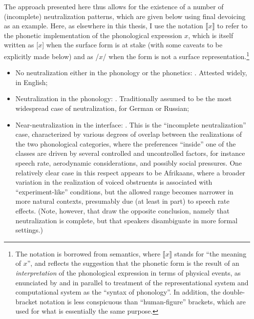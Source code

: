 The approach presented here thus allows for the existence of a number of (incomplete) neutralization patterns, which are given below using final devoicing as an example. Here, as elsewhere in this thesis, I use the notation $\llbracket x\rrbracket$ to refer to the phonetic implementation of the phonological expression $x$, which is itself written as [$x$] when the surface form is at stake (with some caveats to be explicitly made below) and as /$x$/ when the form is not a surface representation.\footnote{The notation is borrowed from semantics, where $\llbracket x\rrbracket$ stands for \enquote{the meaning of $x$}, and reflects the suggestion that the phonetic form is the result of an \emph{interpretation} of the phonological expression in terms of physical events, as enunciated by \citet{pierrehumbert90:_phonol} and in parallel to  treatment of the representational system and computational system as the \enquote{syntax of phonology}. In addition, the double\hyp bracket notation is less conspicuous than  \enquote{human\hyp figure} brackets, which are used for what is essentially the same purpose.}

\begin{itemize}
\item No neutralization either in the phonology or the phonetics: . Attested widely, \eg in English;
\item Neutralization in the phonology: . Traditionally assumed to be the most widespread case of neutralization, \eg for German or Russian;
\item Near\hyp neutralization in the interface: . This is the \enquote{incomplete neutralization} case, characterized by various degrees of overlap between the realizations of the two phonological categories, where the preferences \enquote{inside} one of the classes are driven by several controlled and uncontrolled factors, for instance speech rate, aerodynamic considerations, and possibly social pressures. One relatively clear case in this respect appears to be Afrikaans, where a broader variation in the realization of voiced obstruents is associated with \enquote{experiment\hyp like} conditions, but the allowed range becomes narrower in more natural contexts, presumably due (at least in part) to speech rate effects. (Note, however, that \citealt{rooy03:_demys} draw the opposite conclusion, namely that neutralization is complete, but that speakers disambiguate in more formal settings.)
\end{itemize}

